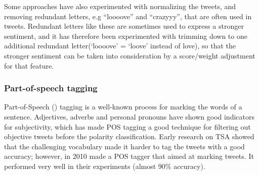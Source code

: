 Some approaches have also experimented with normalizing the tweets, and removing redundant letters, e.g “loooove” and “crazyyy”, that are often used in tweets. Redundant letters like these are sometimes used to express a stronger sentiment, and it has therefore been experimented with trimming down to one additional redundant letter(‘loooove’ = ‘loove’ instead of love), so that the stronger sentiment can be taken into consideration by a score/weight adjustment for that feature.

\subsubsection*{Part-of-speech tagging}
Part-of-Speech () tagging is a well-known process for marking the words of a sentence. Adjectives, adverbs and personal pronouns have shown good indicators for subjectivity, which has made POS tagging a good technique for filtering out objective tweets before the polarity classification. Early research on TSA showed that the challenging vocabulary made it harder to tag the tweets with a good accuracy; however, in 2010 \cite{article:gimpel} made a POS tagger that aimed at marking tweets. It performed very well in their experiments (almost 90\% accuracy).
